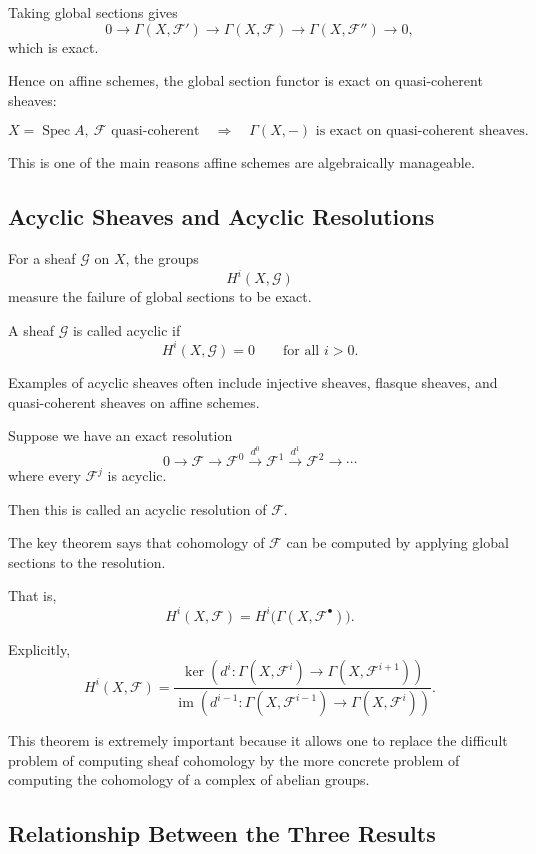 \documentclass[12pt,a4paper]{article}
\theoremstyle{notespace}
\begin{document}
Taking global sections gives
\[
0\to \Gamma(X,\mathcal F')
\to \Gamma(X,\mathcal F)
\to \Gamma(X,\mathcal F'')
\to 0,
\]
which is exact.

Hence on affine schemes, the global section functor is exact on quasi-coherent sheaves:

\[
\boxed{
	X=\operatorname{Spec}A,\ \mathcal F \text{ quasi-coherent}
	\quad\Longrightarrow\quad
	\Gamma(X,-) \text{ is exact on quasi-coherent sheaves.}
}
\]

This is one of the main reasons affine schemes are algebraically manageable.

\subsection{Acyclic Sheaves and Acyclic Resolutions}

For a sheaf \(\mathcal G\) on \(X\), the groups
\[
H^i(X,\mathcal G)
\]
measure the failure of global sections to be exact.

A sheaf \(\mathcal G\) is called acyclic if
\[
H^i(X,\mathcal G)=0
\qquad\text{for all } i>0.
\]

Examples of acyclic sheaves often include injective sheaves, flasque sheaves, and quasi-coherent sheaves on affine schemes.

Suppose we have an exact resolution
\[
0\to \mathcal F
\to \mathcal F^0
\xrightarrow{d^0}
\mathcal F^1
\xrightarrow{d^1}
\mathcal F^2
\to \cdots
\]
where every \(\mathcal F^j\) is acyclic.

Then this is called an acyclic resolution of \(\mathcal F\).

The key theorem says that cohomology of \(\mathcal F\) can be computed by applying global sections to the resolution.

That is,
\[
H^i(X,\mathcal F)
=
H^i\bigl(\Gamma(X,\mathcal F^\bullet)\bigr).
\]

Explicitly,
\[
\boxed{
	H^i(X,\mathcal F)
	=
	\frac{
		\ker\left(
		d^i:\Gamma(X,\mathcal F^i)\to \Gamma(X,\mathcal F^{i+1})
		\right)
	}{
		\operatorname{im}\left(
		d^{i-1}:\Gamma(X,\mathcal F^{i-1})\to \Gamma(X,\mathcal F^i)
		\right)
	}.
}
\]

This theorem is extremely important because it allows one to replace the difficult problem of computing sheaf cohomology by the more concrete problem of computing the cohomology of a complex of abelian groups.

\subsection{Relationship Between the Three Results}
\end{document}
